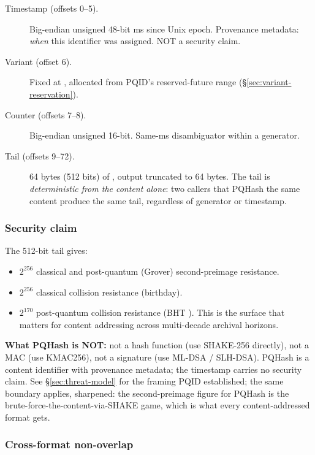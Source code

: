 \begin{description}
  \item[Timestamp (offsets 0--5).] Big-endian unsigned 48-bit ms since Unix epoch. Provenance metadata: \emph{when} this identifier was assigned. NOT a security claim.
  \item[Variant (offset 6).] Fixed at , allocated from PQID's reserved-future range (§\ref{sec:variant-reservation}).
  \item[Counter (offsets 7--8).] Big-endian unsigned 16-bit. Same-ms disambiguator within a generator.
  \item[Tail (offsets 9--72).] 64 bytes (512 bits) of  \citep{fips202}, output truncated to 64 bytes. The tail is \emph{deterministic from the content alone}: two callers that PQHash the same content produce the same tail, regardless of generator or timestamp.
\end{description}

\subsubsection{Security claim}

The 512-bit tail gives:
\begin{itemize}
  \item $2^{256}$ classical and post-quantum (Grover) second-preimage resistance.
  \item $2^{256}$ classical collision resistance (birthday).
  \item $2^{170}$ post-quantum collision resistance (BHT \citep{bht1998}). This is the surface that matters for content addressing across multi-decade archival horizons.
\end{itemize}

\textbf{What PQHash is NOT:} not a hash function (use SHAKE-256 directly), not a MAC (use KMAC256), not a signature (use ML-DSA / SLH-DSA). PQHash is a content identifier with provenance metadata; the timestamp carries no security claim. See §\ref{sec:threat-model} for the framing PQID established; the same boundary applies, sharpened: the second-preimage figure for PQHash is the brute-force-the-content-via-SHAKE game, which is what every content-addressed format gets.

\subsubsection{Cross-format non-overlap}


